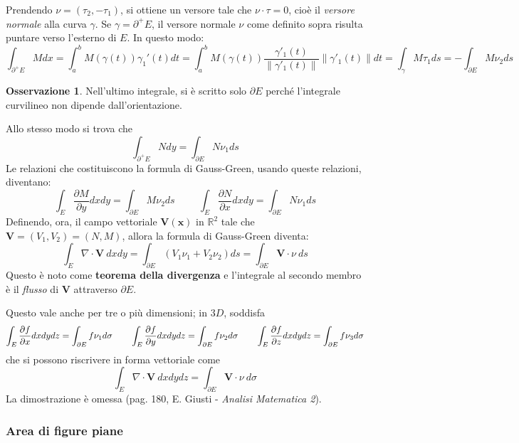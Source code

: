 \documentclass[11pt, a4paper]{scrartcl}
\theoremstyle{definition}
\numberwithin{esempio}{section}
\theoremstyle{definition}
\newtheorem{obs}{Osservazione}
\numberwithin{obs}{section}
\numberwithin{nota}{section}
\numberwithin{equation}{subsection}
\begin{document}
Prendendo $\nu = (\tau _2, -\tau _1)$, si ottiene un versore tale che $\nu \cdot \tau =0 $, cio\`e il \textit{versore normale} alla curva $\gamma$.
Se $\gamma = \partial ^+ E$, il versore normale $\nu $ come definito sopra risulta puntare verso l'esterno di $E$.
In questo modo:
\[
\int_{\partial ^+E} M dx = \int_{a} ^b M(\gamma(t)) \gamma_1'(t) dt = \int_{a} ^b M(\gamma(t)) \frac{\gamma'_1(t)}{\left\lVert \gamma'_1(t) \right\rVert }\left\lVert \gamma'_1(t) \right\rVert  dt  = \int_{\gamma} M\tau _1  ds = - \int_{\partial E} M\nu _2 ds
\] 
\begin{obs}
	Nell'ultimo integrale, si \`e scritto solo $\partial E$ perch\'e l'integrale curvilineo non dipende dall'orientazione.
\end{obs}
Allo stesso modo si trova che
\[
\int_{\partial ^+ E} N dy = \int_{\partial E} N \nu_1 ds
\] 
Le relazioni che costituiscono la formula di Gauss-Green, usando queste relazioni, diventano:
\[
\int_{E} \frac{\partial M}{\partial y} dxdy = \int_{\partial E} M\nu _2  ds \hspace{1cm}\int_{E} \frac{\partial N}{\partial x} dxdy = \int_{\partial E} N \nu _1 ds
\] 
Definendo, ora, il campo vettoriale $\mathbf{V} (\mathbf{x} )$ in $\mathbb{R}^2$ tale che $\mathbf{V} = (V_1,V_2) = (N,M)$, allora la formula di Gauss-Green diventa:
\begin{equation}
	\int_{E} \nabla \cdot \mathbf{V} \ dxdy = \int_{\partial E} (V_1 \nu _1 + V_2 \nu _2) ds = \int_{\partial E} \mathbf{V} \cdot \nu \ ds
\end{equation}
Questo \`e noto come \textbf{teorema della divergenza} e l'integrale al secondo membro \`e il \textit{flusso} di $\mathbf{V} $ attraverso $\partial E$.

Questo vale anche per tre o pi\`u dimensioni; in $3D$, soddisfa
\[
\int_{E} \frac{\partial f}{\partial x} dxdydz = \int_{\partial E} f\nu _1 d\sigma \hspace{.7cm} \int_{E} \frac{\partial f}{\partial y} dxdydz = \int_{\partial E} f\nu _2 d\sigma \hspace{.7cm}\int_{E} \frac{\partial f}{\partial z} dxdydz = \int_{\partial E} f\nu _3 d\sigma
\] 
che si possono riscrivere in forma vettoriale come
\begin{equation}
	\int_{E} \nabla \cdot \mathbf{V} \ dxdydz = \int_{\partial E} \mathbf{V} \cdot \nu \ d\sigma 
\end{equation}
La dimostrazione \`e omessa (pag. 180, E. Giusti - \textit{Analisi Matematica 2}).

\subsubsection{Area di figure piane}
\end{document}
